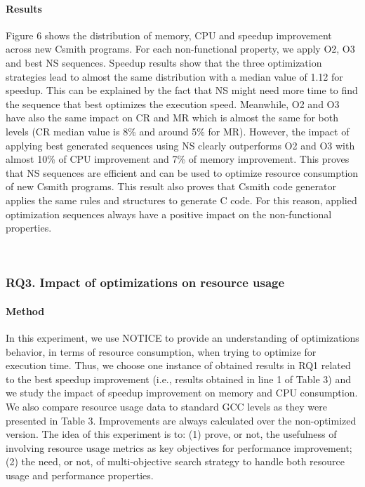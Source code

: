 \paragraph{Results}
Figure 6 shows the distribution of memory, CPU and speedup improvement across new Csmith programs. For each non-functional property, we apply O2, O3 and best NS sequences. Speedup results show that the three optimization strategies lead to almost the same distribution with a median value of 1.12 for speedup. This can be explained by the fact that NS might need more time to find the sequence that best optimizes the execution speed. Meanwhile, O2 and O3 have also the same impact on CR and MR which is almost the same for both levels (CR median value is 8\% and around 5\% for MR).
However, the impact of applying best generated sequences using NS clearly outperforms O2 and O3 with almost 10\% of CPU improvement and 7\% of memory improvement. This proves that NS sequences are efficient and can be used to optimize resource consumption of new Csmith programs. This result also proves that Csmith code generator applies the same rules and structures to generate C code. For this reason, applied optimization sequences always have a positive impact on the non-functional properties.


\noindent{}\\
\subsubsection{RQ3. Impact of optimizations on resource usage}
\paragraph{Method}
In this experiment, we use NOTICE to provide an understanding of optimizations behavior, in terms of resource consumption, when trying to optimize for execution time. Thus, we choose one instance of obtained results in RQ1 related to the best speedup improvement (i.e., results obtained in line 1 of Table 3) and we study the impact of speedup improvement on memory and CPU consumption. We also compare resource usage data to standard GCC levels as they were presented in Table 3. Improvements are always calculated over the non-optimized version. The idea of this experiment is to: (1) prove, or not, the usefulness of involving resource usage metrics as key objectives for performance improvement; (2) the need, or not, of multi-objective search strategy to handle both resource usage and performance properties.

